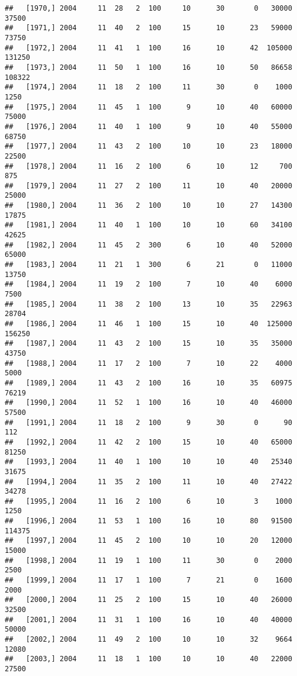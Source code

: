 \documentclass{article}\usepackage[]{graphicx}\usepackage[]{color}
\makeatletter
\newenvironment{kframe}{%
 \def\at@end@of@kframe{}%
 \ifinner\ifhmode%
  \def\at@end@of@kframe{\end{minipage}}%
  \begin{minipage}{\columnwidth}%
 \fi\fi%
 \def\FrameCommand##1{\hskip\@totalleftmargin \hskip-\fboxsep
 \colorbox{shadecolor}{##1}\hskip-\fboxsep
     \hskip-\linewidth \hskip-\@totalleftmargin \hskip\columnwidth}%
 \MakeFramed {\advance\hsize-\width
   \@totalleftmargin\z@ \linewidth\hsize
   \@setminipage}}%
 {\par\unskip\endMakeFramed%
 \at@end@of@kframe}
\newenvironment{knitrout}{}{} %
\makeatother
\begin{document}
\begin{knitrout}
\begin{kframe}
\begin{verbatim}
##   [1970,] 2004     11  28   2  100     10      30       0   30000   37500
##   [1971,] 2004     11  40   2  100     15      10      23   59000   73750
##   [1972,] 2004     11  41   1  100     16      10      42  105000  131250
##   [1973,] 2004     11  50   1  100     16      10      50   86658  108322
##   [1974,] 2004     11  18   2  100     11      30       0    1000    1250
##   [1975,] 2004     11  45   1  100      9      10      40   60000   75000
##   [1976,] 2004     11  40   1  100      9      10      40   55000   68750
##   [1977,] 2004     11  43   2  100     10      10      23   18000   22500
##   [1978,] 2004     11  16   2  100      6      10      12     700     875
##   [1979,] 2004     11  27   2  100     11      10      40   20000   25000
##   [1980,] 2004     11  36   2  100     10      10      27   14300   17875
##   [1981,] 2004     11  40   1  100     10      10      60   34100   42625
##   [1982,] 2004     11  45   2  300      6      10      40   52000   65000
##   [1983,] 2004     11  21   1  300      6      21       0   11000   13750
##   [1984,] 2004     11  19   2  100      7      10      40    6000    7500
##   [1985,] 2004     11  38   2  100     13      10      35   22963   28704
##   [1986,] 2004     11  46   1  100     15      10      40  125000  156250
##   [1987,] 2004     11  43   2  100     15      10      35   35000   43750
##   [1988,] 2004     11  17   2  100      7      10      22    4000    5000
##   [1989,] 2004     11  43   2  100     16      10      35   60975   76219
##   [1990,] 2004     11  52   1  100     16      10      40   46000   57500
##   [1991,] 2004     11  18   2  100      9      30       0      90     112
##   [1992,] 2004     11  42   2  100     15      10      40   65000   81250
##   [1993,] 2004     11  40   1  100     10      10      40   25340   31675
##   [1994,] 2004     11  35   2  100     11      10      40   27422   34278
##   [1995,] 2004     11  16   2  100      6      10       3    1000    1250
##   [1996,] 2004     11  53   1  100     16      10      80   91500  114375
##   [1997,] 2004     11  45   2  100     10      10      20   12000   15000
##   [1998,] 2004     11  19   1  100     11      30       0    2000    2500
##   [1999,] 2004     11  17   1  100      7      21       0    1600    2000
##   [2000,] 2004     11  25   2  100     15      10      40   26000   32500
##   [2001,] 2004     11  31   1  100     16      10      40   40000   50000
##   [2002,] 2004     11  49   2  100     10      10      32    9664   12080
##   [2003,] 2004     11  18   1  100     10      10      40   22000   27500

\end{verbatim}
\end{kframe}
\end{knitrout}
\end{document}
